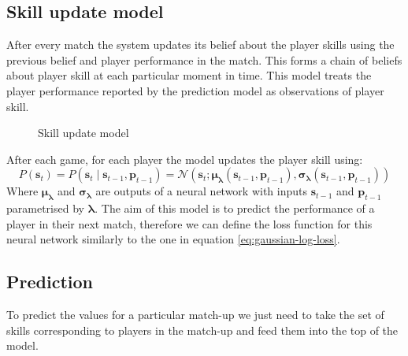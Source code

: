 \documentclass[12pt,a4paper]{book}
\newcommand\bs[1]{\boldsymbol{#1}}
\begin{document}
\subsection{Skill update model}
After every match the system updates its belief about the player skills using the previous belief and player performance in the match.
This forms a chain of beliefs about player skill at each particular moment in time.
This model treats the player performance reported by the prediction model as observations of player skill.
\begin{figure}[ht]
\centering
{}
\caption{Skill update model}
\label{fig:skill-update}
\end{figure}
After each game, for each player the model updates the player skill using:
\begin{equation}
P(\bs{s}_t) = P(\bs{s}_t\mid \bs{s}_{t-1},\bs{p}_{t-1}) = \mathcal{N}(\bs{s}_t;\bs{\mu_\lambda}(\bs{s}_{t-1},\bs{p}_{t-1}),\bs{\sigma_\lambda}(\bs{s}_{t-1},\bs{p}_{t-1}))
\end{equation}
Where $\bs{\mu_\lambda}$ and $\bs{\sigma_\lambda}$ are outputs of a neural network with inputs $\bs{s}_{t-1}$ and $\bs{p}_{t-1}$ parametrised by $\bs{\lambda}$.
The aim of this model is to predict the performance of a player in their next match, therefore we can define the loss function for this neural network similarly to the one in equation \ref{eq:gaussian-log-loss}.
\subsection{Prediction}
To predict the values for a particular match-up we just need to take the set of skills corresponding to players in the match-up and feed them into the top of the model.
\end{document}
